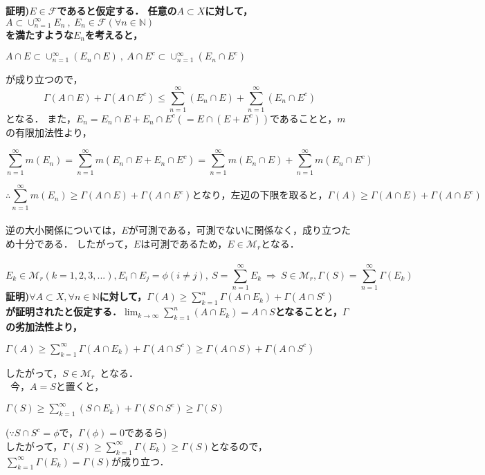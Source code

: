 \documentclass[11pt, a4paper, dvipdfmx]{jsarticle}
\theoremstyle{definition}
\renewcommand{\proofname}{\bfseries Proof}
\renewcommand{\proofname}{\bfseries 証明}
\newcommand{\N}{\mathbb{N}}
\newcommand{\F}{\mathcal{F}}
\begin{document}
\proofname)$E \in \F$であると仮定する．
任意の$A \subset X$に対して，$A \subset \cup_{n=1}^{\infty}E_n~,~E_n \in \F(\forall n \in \N)$\\
を満たすような$E_n$を考えると，
\begin{center}
  $A \cap E \subset \cup^{\infty}_{n=1}(E_n \cap E)~,~A \cap E^c \subset \cup^{\infty}_{n=1}(E_n \cap E^c)$
\end{center}
が成り立つので，$$\Gamma(A \cap E)+\Gamma(A \cap E^c) \le \sum^{\infty}_{n=1}(E_n\cap E) + \sum^{\infty}_{n=1}(E_n\cap E^c)$$
となる．
  また，$E_n = E_n \cap E + E_n \cap E^c (= E \cap (E+E^c))$であることと，$m$の有限加法性より，
\begin{center}
  $$\sum^{\infty}_{n=1}m(E_n) = \sum^{\infty}_{n=1}m(E_n \cap E + E_n \cap E^c)
  = \sum^{\infty}_{n=1}m(E_n \cap E)+\sum^{\infty}_{n=1}m(E_n \cap E^c)$$
\end{center}
$$
\therefore \sum^{\infty}_{n=1}m(E_n) \ge \Gamma(A \cap E)+\Gamma(A \cap E^c)となり，左辺の下限を取ると，
\Gamma(A) \ge \Gamma(A \cap E)+\Gamma(A \cap E^c)
$$
\\
逆の大小関係については，$E$が可測である，可測でないに関係なく，成り立つため十分である．
したがって，$E$は可測であるため，$E \in \mathcal{M}_r$となる．\\
\\
\Theorem
$$
E_k \in \mathcal{M}_r(k = 1,2,3,...), E_i \cap E_j = \phi(i \neq j),~S = \sum^{\infty}_{n=1}E_k
~\Rightarrow ~S \in \mathcal{M}_r, \Gamma(S) = \sum^{\infty}_{n=1}\Gamma(E_k)
$$
\proofname)$\forall A \subset X,\forall n \in \N$に対して，$\Gamma(A)\ge \sum^{n}_{k=1}\Gamma(A\cap E_k)+\Gamma(A\cap S^c)$ \\
が証明されたと仮定する．$\lim_{k \rightarrow \infty}\sum^{n}_{k=1}(A \cap E_k) = A \cap S$となることと，$\Gamma$の劣加法性より，\\
\begin{center}
  $\Gamma(A) \ge \sum^{\infty}_{k=1}\Gamma(A\cap E_k)+\Gamma(A\cap S^c) \ge \Gamma(A\cap S)+\Gamma(A\cap S^c)$
\end{center}
したがって，$S \in \mathcal{M}_r$ となる．\\
~今，$A = S$と置くと，
\begin{center}
  $\Gamma(S) \ge \sum^{\infty}_{k=1}(S\cap E_k)+\Gamma(S\cap S^c) \ge \Gamma(S)$
\end{center}
($\because S\cap S^c = \phi$で，$\Gamma(\phi) = 0$であるら)\\
したがって，$\Gamma(S)\ge \sum^{\infty}_{k=1}\Gamma(E_k)\ge \Gamma(S)$となるので，$\sum^{\infty}_{k=1}\Gamma(E_k) = \Gamma(S)$が成り立つ．\\
\end{document}
